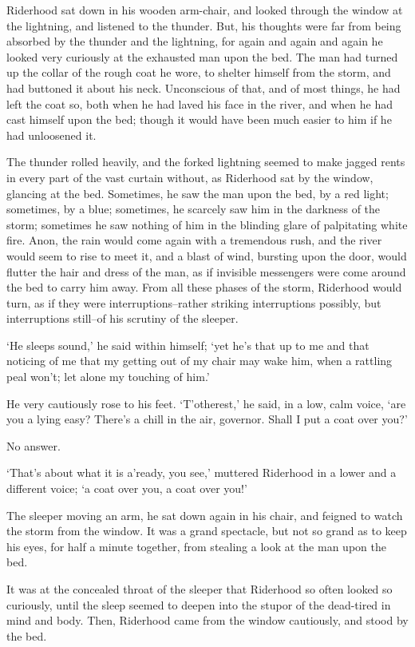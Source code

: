 Riderhood sat down in his wooden arm-chair, and looked through the
window at the lightning, and listened to the thunder. But, his thoughts
were far from being absorbed by the thunder and the lightning, for again
and again and again he looked very curiously at the exhausted man upon
the bed. The man had turned up the collar of the rough coat he wore,
to shelter himself from the storm, and had buttoned it about his neck.
Unconscious of that, and of most things, he had left the coat so, both
when he had laved his face in the river, and when he had cast himself
upon the bed; though it would have been much easier to him if he had
unloosened it.

The thunder rolled heavily, and the forked lightning seemed to make
jagged rents in every part of the vast curtain without, as Riderhood sat
by the window, glancing at the bed. Sometimes, he saw the man upon the
bed, by a red light; sometimes, by a blue; sometimes, he scarcely saw
him in the darkness of the storm; sometimes he saw nothing of him in
the blinding glare of palpitating white fire. Anon, the rain would come
again with a tremendous rush, and the river would seem to rise to meet
it, and a blast of wind, bursting upon the door, would flutter the hair
and dress of the man, as if invisible messengers were come around the
bed to carry him away. From all these phases of the storm, Riderhood
would turn, as if they were interruptions--rather striking interruptions
possibly, but interruptions still--of his scrutiny of the sleeper.

‘He sleeps sound,’ he said within himself; ‘yet he’s that up to me and
that noticing of me that my getting out of my chair may wake him, when a
rattling peal won’t; let alone my touching of him.’

He very cautiously rose to his feet. ‘T’otherest,’ he said, in a low,
calm voice, ‘are you a lying easy? There’s a chill in the air, governor.
Shall I put a coat over you?’

No answer.

‘That’s about what it is a’ready, you see,’ muttered Riderhood in a
lower and a different voice; ‘a coat over you, a coat over you!’

The sleeper moving an arm, he sat down again in his chair, and feigned
to watch the storm from the window. It was a grand spectacle, but not so
grand as to keep his eyes, for half a minute together, from stealing a
look at the man upon the bed.

It was at the concealed throat of the sleeper that Riderhood so often
looked so curiously, until the sleep seemed to deepen into the stupor
of the dead-tired in mind and body. Then, Riderhood came from the window
cautiously, and stood by the bed.

